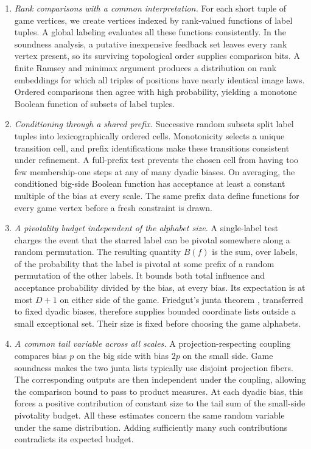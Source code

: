 \begin{enumerate}[label=\textup{(\arabic*)}]
\item \emph{Rank comparisons with a common interpretation.}
For each short tuple of game vertices, we create vertices indexed by
rank-valued functions of label tuples. A global labeling evaluates
all these functions consistently. In the soundness analysis, a
putative inexpensive feedback set leaves every rank vertex present,
so its surviving topological order supplies comparison bits. A
finite Ramsey and minimax argument produces a distribution on rank
embeddings for which all triples of positions have nearly identical
image laws. Ordered comparisons then agree with high probability,
yielding a monotone Boolean function of subsets of label tuples.

\item \emph{Conditioning through a shared prefix.}
Successive random subsets split label tuples into lexicographically
ordered cells. Monotonicity selects a unique transition cell, and
prefix identifications make these transitions consistent under
refinement. A full-prefix test prevents the chosen cell from having
too few membership-one steps at any of many dyadic biases. On
averaging, the conditioned big-side Boolean function has acceptance
at least a constant multiple of the bias at every scale. The same
prefix data define functions for every game vertex before a fresh
constraint is drawn.

\item \emph{A pivotality budget independent of the alphabet size.}
A single-label test charges the event that the starred label can be
pivotal somewhere along a random permutation. The resulting quantity $B(f)$ is the sum, over labels, of the
probability that the label is pivotal at some prefix of a random
permutation of the other labels. It bounds both total influence and
acceptance probability divided by the bias, at every bias. Its
expectation is at most $D+1$ on either side of the game. Friedgut's junta theorem \cite{Friedgut1998}, transferred
to fixed dyadic biases, therefore supplies bounded coordinate lists
outside a small exceptional set. Their size is fixed before choosing
the game alphabets.

\item \emph{A common tail variable across all scales.}
A projection-respecting coupling compares bias $p$ on the big side
with bias $2p$ on the small side. Game soundness makes the two junta
lists typically use disjoint projection fibers. The corresponding
outputs are then independent under the coupling, allowing the
comparison bound to pass to product measures. At each dyadic bias, this forces a positive contribution of constant
size to the tail sum of the small-side pivotality budget. All these
estimates concern the same random variable under the same distribution.
Adding sufficiently many such contributions contradicts its expected
budget.
\end{enumerate}

